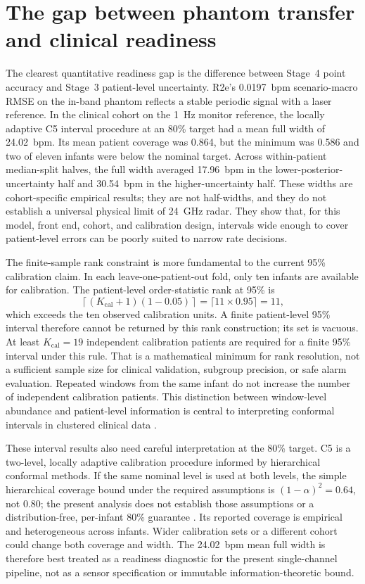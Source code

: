 \section{The gap between phantom transfer and clinical readiness}
\label{sec:ch7_readiness}

The clearest quantitative readiness gap is the difference between Stage~4 point accuracy and
Stage~3 patient-level uncertainty. R2e's 0.0197~bpm scenario-macro RMSE on the in-band phantom
reflects a stable periodic signal with a laser reference. In the clinical cohort on the 1~Hz
monitor reference, the locally adaptive C5 interval procedure at an 80\% target had a mean full
width of 24.02~bpm. Its mean patient coverage was 0.864, but the minimum was 0.586 and two of
eleven infants were below the nominal target. Across within-patient median-split halves, the full
width averaged 17.96~bpm in the lower-posterior-uncertainty half and 30.54~bpm in the
higher-uncertainty half. These widths are cohort-specific empirical results;
they are not half-widths, and they do not establish a universal physical limit of 24~GHz radar.
They show that, for this model, front end, cohort, and calibration design, intervals wide enough
to cover patient-level errors can be poorly suited to narrow rate decisions.

The finite-sample rank constraint is more fundamental to the current 95\% calibration claim. In
each leave-one-patient-out fold, only ten infants are available for calibration. The patient-level
order-statistic rank at 95\% is
\[
  \left\lceil (K_{\mathrm{cal}}+1)(1-0.05)\right\rceil
  =\lceil 11\times0.95\rceil=11,
\]
which exceeds the ten observed calibration units. A finite patient-level 95\% interval
therefore cannot be returned by this rank construction; its set is vacuous. At least
$K_{\mathrm{cal}}=19$ independent calibration patients are required for a finite 95\% interval
under this rule. That is a mathematical minimum for rank resolution, not a sufficient sample
size for clinical validation, subgroup precision, or safe alarm evaluation. Repeated windows
from the same infant do not increase the number of independent calibration patients. This
distinction between window-level abundance and patient-level information is central to
interpreting conformal intervals in clustered clinical data \citep{dunn2023distribution,barber2023conformal}.

These interval results also need careful interpretation at the 80\% target. C5 is a two-level,
locally adaptive calibration procedure informed by hierarchical conformal methods. If the same
nominal level is used at both levels, the simple hierarchical coverage bound under the required
assumptions is $(1-\alpha)^2=0.64$, not 0.80; the present analysis does not establish those
assumptions or a distribution-free, per-infant 80\% guarantee \citep{dunn2023distribution}.
Its reported coverage is empirical and heterogeneous across infants. Wider calibration sets or
a different cohort could change both coverage and width. The 24.02~bpm mean full width is
therefore best treated as a readiness diagnostic for the present single-channel pipeline, not
as a sensor specification or immutable information-theoretic bound.

